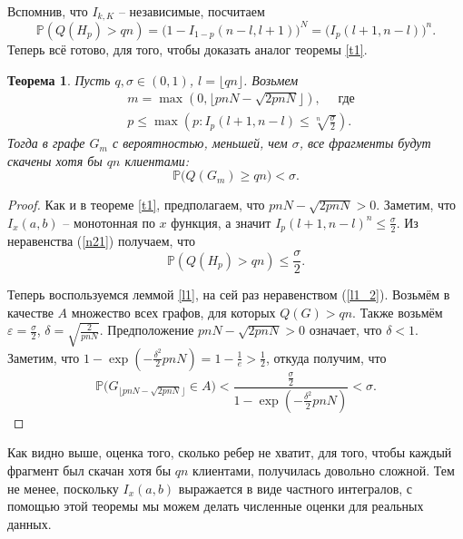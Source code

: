 \documentclass{matmex-diploma-custom}
\newcommand{\PRob}{\mathbb P}
\newcommand{\leqs}{\leqslant}
\newcommand{\geqs}{\geqslant}
\newcommand{\eps}{\varepsilon}
\newtheorem{theorem}{Теорема}
\theoremstyle{named}
\begin{document}
Вспомнив, что $I_{k,K}$ -- независимые, посчитаем
\begin{equation}\label{n21}
\PRob(Q(H_p) > qn) = \big(1 - I_{1-p}(n-l, l+1)\big)^N = \big(I_{p}(l+1, n-l)\big)^n.
\end{equation}
Теперь всё готово, для того, чтобы доказать аналог теоремы \ref{t1}.

\begin{theorem}\label{t2}
Пусть $q, \sigma \in (0, 1)$, $l = \lfloor qn \rfloor$. Возьмем 
\begin{align}
& m = \max(0, \lfloor pnN - \sqrt{2pnN} \rfloor), \quad \text{ где} \\
& p \leqs \max\left(p :  I_p(l+1, n-l) \leqs \sqrt[n]{\frac\sigma{2}} \right).
\end{align}
Тогда в графе $G_m$ с вероятностью, меньшей, чем $\sigma$, все фрагменты будут скачены хотя бы $qn$ клиентами:
\begin{equation}
\PRob\big(Q(G_m) \geqs qn\big) < \sigma.
\end{equation}
\end{theorem}


\begin{proof}
Как и в теореме \ref{t1}, предполагаем, что $pnN - \sqrt{2pnN} > 0$.
Заметим, что $I_x(a,b)$ -- монотонная по $x$ функция, а значит $I_p(l+1, n-l)^n \leqs \frac\sigma{2}$. 
Из неравенства (\ref{n21}) получаем, что
\begin{equation}
\PRob(Q(H_p) > qn) \leqs \frac\sigma{2}.
\end{equation}

Теперь воспользуемся леммой \ref{l1}, на сей раз неравенством (\ref{l1_2}).
Возьмём в качестве $A$ множество всех графов, для которых $Q(G) > qn$.
Также возьмём $\eps = \frac\sigma{2}$, $\delta = \sqrt{\frac{2}{pnN}}$.
Предположение $pnN - \sqrt{2pnN} > 0$ означает, что $\delta < 1$.
Заметим, что $1 - \exp\left(-\frac{\delta^2}{2}pnN\right) = 1 - \frac{1}{e} > \frac{1}{2}$, откуда получим, что
\begin{equation}
\PRob\big(G_{\lfloor pnN - \sqrt{2pnN} \rfloor} \in A\big) 
	< 
\frac{\frac\sigma{2}}{1 - \exp\left(-\frac{\delta^2}{2}pnN\right)}
	<
\sigma.
\end{equation}
\end{proof}

Как видно выше, оценка того, сколько ребер не хватит, для того, 
чтобы каждый фрагмент был скачан хотя бы $qn$ клиентами, получилась довольно сложной.
Тем не менее, поскольку $I_x(a, b)$ выражается в виде частного интегралов, 
с помощью этой теоремы мы можем делать численные оценки для реальных данных.
\end{document}
